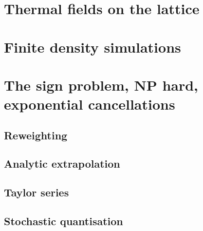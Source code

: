\section{Thermal fields on the lattice} \label{sec-thermal-lattice-theory}

\section{Finite density simulations} \label{sec-finite-density-lattice}

\section{The sign problem, NP hard, exponential cancellations}
\label{sec-sign-problem}

\subsection{Reweighting}
\subsection{Analytic extrapolation}
\subsection{Taylor series}
\subsection{Stochastic quantisation}
